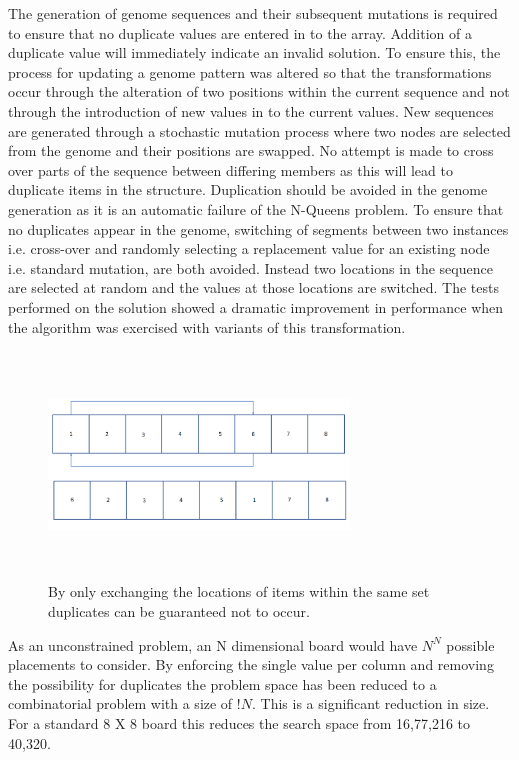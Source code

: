 \documentclass[conference]{IEEEtran}
\begin{document}
The generation of genome sequences and their subsequent mutations is required to ensure that no duplicate values are entered in to the array. Addition of a duplicate value will immediately indicate an invalid solution. To ensure this, the process for updating a genome pattern was altered so that the transformations occur through the alteration of two positions within the current sequence and not through the introduction of new values in to the current values. New sequences are generated through a stochastic mutation process where two nodes are selected from the genome and their positions are swapped. No attempt is made to cross over parts of the sequence between differing members as this will lead to duplicate items in the structure. Duplication should be avoided in the genome generation as it is an automatic failure of the N-Queens problem. To ensure that no duplicates appear in the genome, switching of segments between two instances i.e. cross-over and randomly selecting a replacement value for an existing node i.e. standard mutation, are both avoided. Instead two locations in the sequence are selected at random and the values at those locations are switched. The tests performed on the solution showed a dramatic improvement in performance when the algorithm was exercised with variants of this transformation.

\begin{figure}[!htbp]
	\centering	
	\includegraphics[width=8cm, height=6cm]{SimpleCrossOver}
	\caption{By only exchanging the locations of items within the same set duplicates can be guaranteed not to occur.}
\end{figure}

As an unconstrained problem, an N dimensional board would have $N^N$ possible placements to consider. By enforcing the single value per column and removing the possibility for duplicates the problem space has been reduced to a combinatorial problem with a size of $!N$. This is a significant reduction in size. For a standard 8 X 8 board this reduces the search space from 16,77,216 to 40,320.
\end{document}
